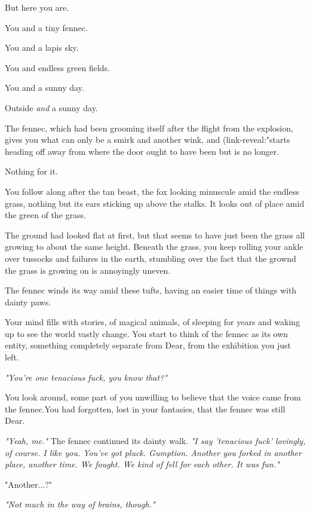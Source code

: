 But here you are.

\phantom{But here you are. }You and a tiny fennec.

\phantom{But here you are. }You and a lapis sky.

\phantom{But here you are. }You and endless green fields.

\phantom{But here you are. }You and a sunny day.

Outside \emph{and} a sunny day.

The fennec, which had been grooming itself after the flight from the explosion, gives you what can only be a smirk and another wink, and (link-reveal:"starts heading off away from where the door ought to have been but is no longer.

Nothing for it.

\newpage

You follow along after the tan beast, the fox looking minuscule amid the endless grass, nothing but its ears sticking up above the stalks. It looks out of place amid the green of the grass.

The ground had looked flat at first, but that seems to have just been the grass all growing to about the same height. Beneath the grass, you keep rolling your ankle over tussocks and failures in the earth, stumbling over the fact that the grownd the grass is growing on is annoyingly uneven.

The fennec winds its way amid these tufts, having an easier time of things with dainty paws.

Your mind fills with stories, of magical animals, of sleeping for years and waking up to see the world vastly change. You start to think of the fennec as its own entity, something completely separate from Dear, from the exhibition you just left.

\emph{"You're one tenacious fuck, you know that?"}

You look around, some part of you unwilling to believe that the voice came from the fennec.You had forgotten, lost in your fantasies, that the fennec was still Dear.

\emph{"Yeah, me."} The fennec continued its dainty walk. \emph{"I say 'tenacious fuck' lovingly, of course. I like you. You've got pluck. Gumption. Another you forked in another place, another time. We fought. We kind of fell for each other. It was fun."}

"Another...?"

\emph{"Not much in the way of brains, though."}

